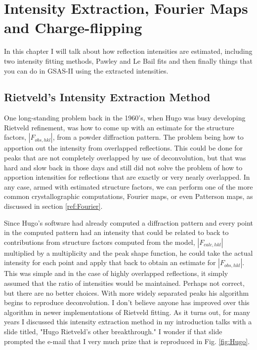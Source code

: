 \chapter{Intensity Extraction, Fourier Maps and Charge-flipping}\label{Chap:intextraction}

In this chapter I will talk about how reflection intensities are estimated, including two intensity fitting methods, Pawley and Le Bail fits and then finally things that you can do in GSAS-II using the extracted intensities. 

\section{Rietveld's Intensity Extraction Method}

One long-standing problem back in the 1960's, when Hugo was busy developing Rietveld refinement, was how to come up with an estimate for the structure factors, $|F_{obs, hkl}|$, from a powder diffraction pattern. The problem being how to apportion out the intensity from overlapped reflections. This could be done for peaks that are not completely overlapped by use of deconvolution, but that was hard and slow back in those days and still did not solve the problem of how to apportion intensities for reflections that are exactly or very nearly overlapped. In any case, armed with estimated structure factors, we can perform one of the more common crystallographic computations, Fourier maps, or even Patterson maps, as discussed in section \ref{ref:Fourier}.

Since Hugo's software had already computed a diffraction pattern and every point in the computed pattern had an intensity that could be related to back to contributions from structure factors computed from the model,  $|F_{calc, hkl}|$ multiplied by a multiplicity and the peak shape function, he could take the actual intensity for each point and apply that back to obtain an estimate for  $|F_{obs, hkl}|$. This was simple and in the case of highly overlapped reflections, it simply assumed that the ratio of intensities would be maintained. Perhaps not correct, but there are no better choices. With more widely separated peaks his algorithm begins to reproduce deconvolution. I don't believe anyone has improved over this algorithm in newer implementations of Rietveld fitting. As it turns out, for many years I discussed this intensity extraction method in my introduction talks with a slide titled, "Hugo Rietveld's other breakthrough." I wonder if that slide prompted the e-mail that I very much prize that is reproduced in Fig. \ref{fig:Hugo}. 

